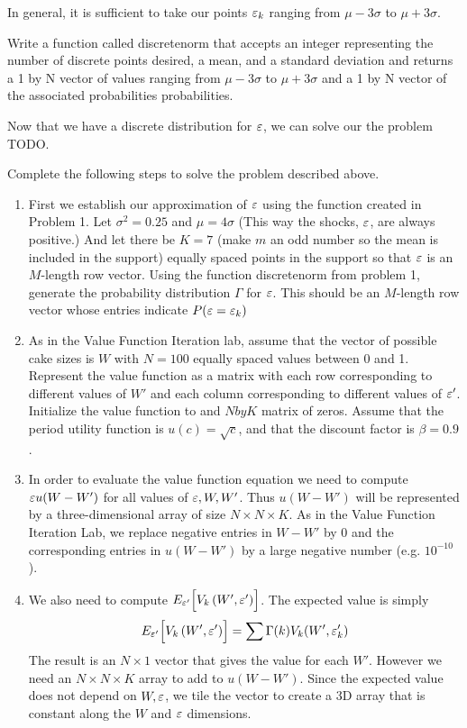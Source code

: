 In general, it is sufficient to take our points $\varepsilon_k$ ranging from $\mu - 3\sigma$ to $\mu + 3\sigma$.

\begin{problem}
Write a function called discretenorm that accepts an integer representing the number of discrete points desired, a mean, and a standard deviation and returns a 1 by N vector of values ranging from $\mu - 3\sigma$ to $\mu + 3\sigma$  and a 1 by N vector of the associated probabilities probabilities.
\end{problem}

Now that we have a discrete distribution for $\varepsilon$, we can solve our the problem TODO.

\begin{problem}
Complete the following steps to solve the problem described above.
\begin{enumerate}
   \item First we establish our approximation of $\varepsilon$ using the function created in Problem 1. Let $\sigma^2 = 0.25$ and $\mu=4\sigma$ (This way the shocks, $\varepsilon$, are always positive.) And let there be $K=7$ (make $m$ an odd number so the mean is included in the support) equally spaced points in the support so that $\varepsilon$ is an $M$-length row vector.  Using the function discretenorm from problem 1, generate the probability distribution $\Gamma$ for $\varepsilon$. This should be an $M$-length row vector whose entries indicate $P(\varepsilon = \varepsilon_k)$

   \item As in the Value Function Iteration lab, assume that the vector of possible cake sizes is $W$ with $N=100$ equally spaced values between 0 and 1.  Represent the value function as a matrix with each row corresponding to different values of $W'$ and each column corresponding to different values of $\varepsilon'$. Initialize the value function to and $N by K$ matrix of zeros.  Assume that the period utility function is $u(c)=\sqrt{c}$, and that the discount factor is $\beta = 0.9$.
       

   \item In order to evaluate the value function equation we need to compute $\varepsilon u(W-W')$ for all values of $\varepsilon,W,W'$.  Thus $u(W-W')$ will be represented by a three-dimensional array of size $N\times N\times K$.  As in the Value Function Iteration Lab, we replace negative entries in $W-W'$ by 0 and the corresponding entries in $u(W-W')$ by a large negative number (e.g. $10^{-10}$).
       
   \item We also need to compute $E_{\varepsilon'}\Bigl[V_k\left(W',\varepsilon'\right)\Bigr]$.  The expected value is simply
       \begin{equation}
       E_{\varepsilon'}\Bigl[V_k\left(W',\varepsilon'\right)\Bigr] = \sum \Gamma(k)V_k(W',\varepsilon_k')
       \end{equation}  The result is an $N\times 1$ vector that gives the value for each $W'$.  However we need an $N\times N\times K$ array to add to $u(W-W')$.  Since the expected value does not depend on $W,\varepsilon$, we tile the vector to create a 3D array that is constant along the $W$ and $\varepsilon$ dimensions.
           

\end{enumerate}
\end{problem}
